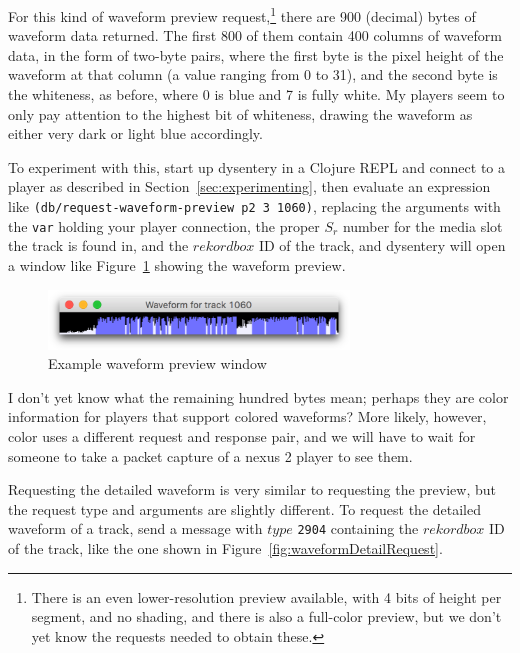 \documentclass[11pt]{article}
\begin{document}
For this kind of waveform preview request,\footnote{There is an even
  lower-resolution preview available, with 4 bits of height per
  segment, and no shading, and there is also a full-color preview, but
  we don't yet know the requests needed to obtain these.} there are
900 (decimal) bytes of waveform data returned. The first 800 of them
contain 400 columns of waveform data, in the form of two-byte pairs,
where the first byte is the pixel height of the waveform at that
column (a value ranging from 0 to 31), and the second byte is the
whiteness, as before, where 0 is blue and 7 is fully white. My players
seem to only pay attention to the highest bit of whiteness, drawing
the waveform as either very dark or light blue accordingly.

To experiment with this, start up dysentery in a Clojure REPL and
connect to a player as described in Section~\ref{sec:experimenting},
then evaluate an expression like {\tt (db/request-waveform-preview p2
  3 1060)}, replacing the arguments with the {\tt var} holding your
player connection, the proper $S_r$ number for the media slot the
track is found in, and the $rekordbox$ ID of the track, and dysentery
will open a window like Figure~{\ref{fig:waveformPreviewExample}}
showing the waveform preview.

\begin{figure}
  \vspace{5mm}
  \centering
  \includegraphics[width=8cm]{assets/Wave-preview-example}
  \caption{Example waveform preview window}
  \label{fig:waveformPreviewExample}
\end{figure}

I don't yet know what the remaining hundred bytes mean; perhaps they
are color information for players that support colored waveforms? More
likely, however, color uses a different request and response pair, and
we will have to wait for someone to take a packet capture of a nexus 2
player to see them.

Requesting the detailed waveform is very similar to requesting the
preview, but the request type and arguments are slightly different.
To request the detailed waveform of a track, send a message with $type$
{\tt 2904} containing the $rekordbox$ ID of the track, like the one
shown in Figure~\ref{fig:waveformDetailRequest}.
\end{document}
